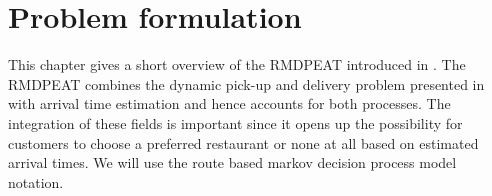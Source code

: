 \chapter{Problem formulation}

This chapter gives a short overview of the RMDPEAT introduced in \cite{Hildebrandt2020_EAT}. The RMDPEAT combines the dynamic pick-up and delivery problem presented in \cite{UlmerRMDP} with arrival time estimation and hence accounts for both processes. The integration of these fields is important since it opens up the possibility for customers to choose a preferred restaurant or none at all based on estimated arrival times. We will use the route based markov decision process model notation.











	
    